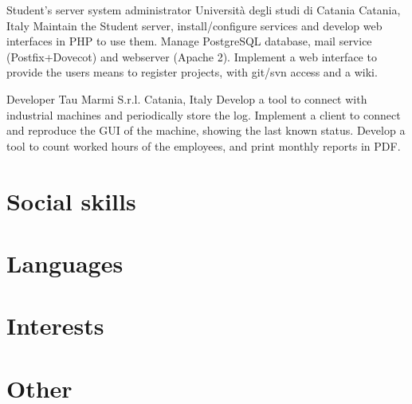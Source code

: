 \documentclass[11pt,a4paper,sans]{moderncv} %
\begin{document}
    {Student's server system administrator}
    {Universit\`{a} degli studi di Catania}
    {Catania, Italy}
    {}
    {Maintain the Student server, install/configure services and develop web interfaces in PHP to use them.
    \newline
    Manage PostgreSQL database, mail service (Postfix+Dovecot) and webserver (Apache 2).
    \newline
    Implement a web interface to provide the users means to register projects, with git/svn access and a wiki.
    }

    {Developer}
    {Tau Marmi S.r.l.}
    {Catania, Italy}
    {}
    {Develop a tool to connect with industrial machines and periodically store the log. Implement a client to connect and reproduce the GUI of the machine, showing the last known status.
    \newline
    Develop a tool to count worked hours of the employees, and print monthly reports in PDF.}


\section{Social skills}


\section{Languages}



\section{Interests}

\section{Other}
\end{document}
